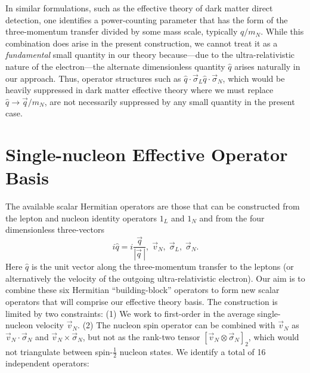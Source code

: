 \documentclass{book}[letterpaper,12pt]
\begin{document}
In similar formulations, such as the effective theory of dark matter direct detection, one identifies a power-counting parameter that has the form of the three-momentum transfer divided by some mass scale, typically $q/m_N$. While this combination does arise in the present construction, we cannot treat it as a \textit{fundamental} small quantity in our theory because---due to the ultra-relativistic nature of the electron---the alternate dimensionless quantity $\hat{q}$ arises naturally in our approach. Thus, operator structures such as $\hat{q}\cdot\vec{\sigma}_L\hat{q}\cdot\vec{\sigma}_N$, which would be heavily suppressed in dark matter effective theory where we must replace $\hat{q}\rightarrow \vec{q}/m_N$, are not necessarily suppressed by any small quantity in the present case.


\section{Single-nucleon Effective Operator Basis}
The available scalar Hermitian operators are those that can be constructed from the lepton and nucleon identity operators $1_L$ and $1_N$ and from the four dimensionless three-vectors
\begin{equation}
i\hat{q}=i\frac{\vec{q}}{|\vec{q}\,|},\;\vec{v}_N,\;\vec{\sigma}_L,\;\vec{\sigma}_N.
\end{equation}
Here $\hat{q}$ is the unit vector along the three-momentum transfer to the leptons (or alternatively the velocity of the outgoing ultra-relativistic electron). Our aim is to combine these six Hermitian ``building-block'' operators to form new scalar operators that will comprise our effective theory basis. The construction is limited by two constraints: (1) We work to first-order in the average single-nucleon velocity $\vec{v}_N$. (2) The nucleon spin operator can be combined with $\vec{v}_N$ as $\vec{v}_N\cdot\vec{\sigma}_N$ and $\vec{v}_N\times\vec{\sigma}_N$, but not as the rank-two tensor $\left[\vec{v}_N\otimes\vec{\sigma}_N\right]_2$, which would not triangulate between spin-$\frac{1}{2}$ nucleon states.  We identify a total of 16 independent operators:
\end{document}
